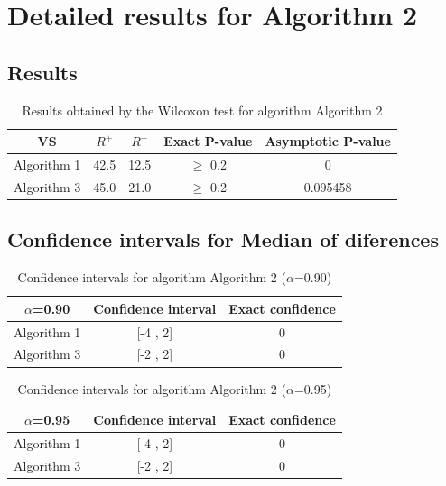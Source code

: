 \documentclass[a4paper,10pt]{article}
\begin{document}
 \clearpage 


\section{Detailed results for Algorithm 2}


\subsection{Results}

\begin{table}[!htp]
\centering\small
\begin{tabular}{
|c|c|c|c|c|}
\hline
 VS & $R^{+}$ & $R^{-}$ & Exact P-value & Asymptotic P-value \\ \hline 
Algorithm 1 & 42.5 & 12.5 & $\geq$ 0.2 & 0\\ \hline 
Algorithm 3 & 45.0 & 21.0 & $\geq$ 0.2 & 0.095458\\ \hline 

\end{tabular}
\caption{Results obtained by the Wilcoxon test for algorithm Algorithm 2}
\end{table}

\subsection{Confidence intervals for Median of diferences}

\begin{table}[!htp]
\centering\small
\begin{tabular}{
|c|c|c|}
\hline
 $\alpha$=0.90 & Confidence interval & Exact confidence \\ \hline 
Algorithm 1 & [-4 , 2] & 0\\ \hline 
Algorithm 3 & [-2 , 2] & 0\\ \hline 

\end{tabular}
\caption{Confidence intervals for algorithm Algorithm 2 ($\alpha$=0.90)}
\end{table}
\begin{table}[!htp]
\centering\small
\begin{tabular}{
|c|c|c|}
\hline
 $\alpha$=0.95 & Confidence interval & Exact confidence \\ \hline 
Algorithm 1 & [-4 , 2] & 0\\ \hline 
Algorithm 3 & [-2 , 2] & 0\\ \hline 

\end{tabular}
\caption{Confidence intervals for algorithm Algorithm 2 ($\alpha$=0.95)}
\end{table}
\end{document}
